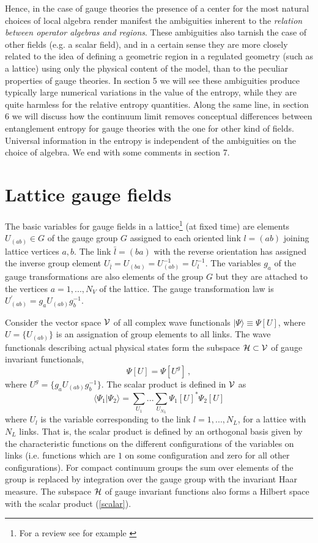 \documentclass[12pt,a4paper]{article}
\begin{document}
Hence, in the case of gauge theories the presence of a center for the most natural choices of local algebra render manifest the ambiguities 
inherent to the {\sl relation between operator algebras and regions}.  
These ambiguities also tarnish the case of other fields (e.g. a scalar field), and in a certain sense they are more closely related to the idea 
of defining a geometric region  in a regulated geometry (such as a lattice) using only the physical content of the model, than to the peculiar 
properties of gauge theories.  In section 5 we will see these ambiguities produce typically large numerical 
variations in the value of the entropy, while they are quite harmless for the relative entropy quantities. 
Along the same line, in section 6 we will discuss how the continuum limit removes conceptual differences between entanglement entropy for gauge theories with the one 
for other kind of fields. Universal information in the entropy is independent of the ambiguities on the choice of algebra. We end with some comments in section 7. 

\section{Lattice gauge fields}
The basic variables for gauge fields in a lattice\footnote{For a review see for example \cite{ks}} (at fixed time) are elements $U_{(ab)}\in G$ of the gauge group $G$ assigned to each oriented 
link $l=(ab)$ joining lattice vertices $a,b$. The link $\bar{l}=(ba)$ with the reverse orientation has assigned the 
inverse group element $U_{\bar{l}}=U_{(ba)}=U_{(ab)}^{-1}=U_l^{-1}$. The variables $g_a$ of the gauge transformations 
are also elements of the group $ G$ but they are attached to the vertices $a=1,...,N_V$ of the lattice.  The gauge transformation 
law is $U_{(ab)}^\prime=g_a U_{(ab)} g_b^{-1}$. 

Consider the vector space ${\cal V}$ of all complex wave functionals $|\Psi\rangle\equiv \Psi[U]$, where $U=\{U_{(ab)}\}$ 
is an assignation of group elements to all links. The wave functionals describing actual physical states form the 
subspace ${\cal H}\subset {\cal V}$ of gauge invariant functionals, 
\begin{equation}
\Psi[U]=\Psi[U^g]\,,
\end{equation}    
where $U^g=\{g_a U_{(ab)}g_b^{-1}\}$. The scalar product is defined in ${\cal V}$ as
\begin{equation}
\langle \Psi_1|\Psi_2\rangle=\sum_{U_{1}} ... \sum_{U_{N_L}} \Psi_1[U]^* \Psi_2[U]\label{scalar}
\end{equation}
where $U_l$ is the variable corresponding to the link $l=1,...,N_L$, for a lattice with $N_L$ links. That is, 
the scalar product is defined by an orthogonal basis given by the characteristic functions on 
the different configurations of the variables on links (i.e. functions which are $1$ on some configuration 
and zero for all other configurations). For compact continuum groups the sum over elements of the group is replaced 
by integration over the gauge group with the invariant Haar measure. The subspace ${\cal H}$ of gauge 
invariant functions also forms a Hilbert space with the scalar product (\ref{scalar}). 
\end{document}
